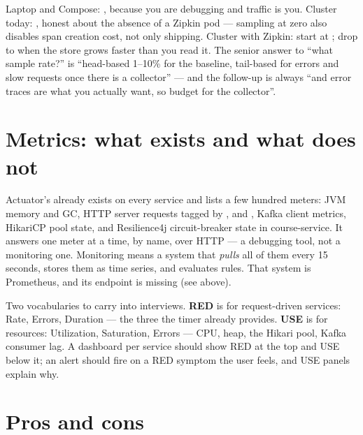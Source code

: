 \begin{decision}
Laptop and Compose: , because you are debugging and traffic
is you. Cluster today: , honest about the absence of a
Zipkin pod --- sampling at zero also disables span creation cost, not
only shipping. Cluster with Zipkin: start at ; drop to
 when the store grows faster than you read it. The senior
answer to ``what sample rate?'' is ``head-based 1--10\% for the
baseline, tail-based for errors and slow requests once there is a
collector'' --- and the follow-up is always ``and error traces are
what you actually want, so budget for the collector''.
\end{decision}

\section{Metrics: what exists and what does not}

Actuator's  already exists on every service and
lists a few hundred meters: JVM memory and GC, HTTP server requests
tagged by ,  and , Kafka client
metrics, HikariCP pool state, and Resilience4j circuit-breaker state
in course-service. It answers one meter at a time, by name, over HTTP
--- a debugging tool, not a monitoring one. Monitoring means a system
that \emph{pulls} all of them every 15 seconds, stores them as time
series, and evaluates rules. That system is Prometheus, and its
endpoint is missing (see  above).

Two vocabularies to carry into interviews. \textbf{RED} is for
request-driven services: Rate, Errors, Duration --- the three the
 timer already provides. \textbf{USE} is
for resources: Utilization, Saturation, Errors --- CPU, heap, the
Hikari pool, Kafka consumer lag. A dashboard per service should show
RED at the top and USE below it; an alert should fire on a RED symptom
the user feels, and USE panels explain why.

\section{Pros and cons}

